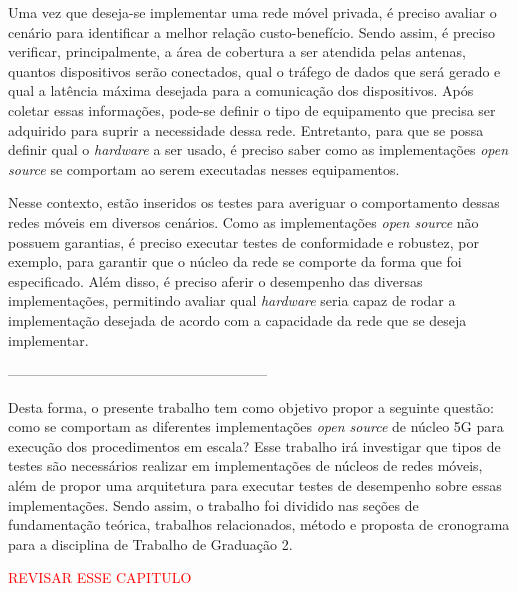 Uma vez que deseja-se implementar uma rede móvel privada, é preciso avaliar o cenário para identificar a melhor relação custo-benefício.
Sendo assim, é preciso verificar, principalmente, a área de cobertura a ser atendida pelas antenas, quantos dispositivos serão conectados, qual o tráfego de dados que será gerado e qual a latência máxima desejada para a comunicação dos dispositivos.
Após coletar essas informações, pode-se definir o tipo de equipamento que precisa ser adquirido para suprir a necessidade dessa rede.
Entretanto, para que se possa definir qual o \textit{hardware} a ser usado, é preciso saber como as implementações \textit{open source} se comportam ao serem executadas nesses equipamentos.

Nesse contexto, estão inseridos os testes para averiguar o comportamento dessas redes móveis em diversos cenários.
Como as implementações \textit{open source} não possuem garantias, é preciso executar testes de conformidade e robustez, por exemplo, para garantir que o núcleo da rede se comporte da forma que foi especificado.
Além disso, é preciso aferir o desempenho das diversas implementações, permitindo avaliar qual \textit{hardware} seria capaz de rodar a implementação desejada de acordo com a capacidade da rede que se deseja implementar.

--------------------------------------------------------

Desta forma, o presente trabalho tem como objetivo propor a seguinte questão: como se comportam as diferentes implementações \textit{open source} de núcleo 5G para execução dos procedimentos em escala?
Esse trabalho irá investigar que tipos de testes são necessários realizar em implementações de núcleos de redes móveis, além de propor uma arquitetura para executar testes de desempenho sobre essas implementações.
Sendo assim, o trabalho foi dividido nas seções de fundamentação teórica, trabalhos relacionados, método e proposta de cronograma para a disciplina de Trabalho de Graduação 2.


\textcolor{red}{REVISAR ESSE CAPITULO}
